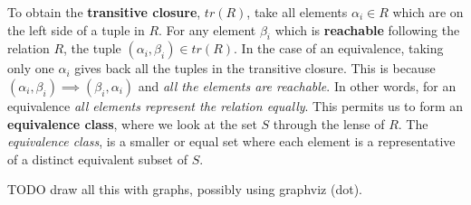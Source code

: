 \documentclass[11pt]{article}
\theoremstyle{plain}
\theoremstyle{definition}
\begin{document}
To obtain the \textbf{transitive closure}, $tr(R)$, take all elements $\alpha_i \in R$ which are on the left side of a tuple in $R$.
For any element $\beta_i$ which is \textbf{reachable} following the relation $R$, the tuple $(\alpha_i, \beta_i) \in tr(R)$.
In the case of an equivalence, taking only one $\alpha_i$ gives back all the tuples in the transitive closure.
This is because $(\alpha_i, \beta_i) \implies (\beta_i, \alpha_i)$ and \emph{all the elements are reachable}.
In other words, for an equivalence \emph{all elements represent the relation equally}.
This permits us to form an \textbf{equivalence class}, where we look at the set $S$ through the lense of $R$.
The \emph{equivalence class}, is a smaller or equal set where each element is a representative of a distinct equivalent subset of $S$.

TODO draw all this with graphs, possibly using graphviz (dot).
\end{document}

